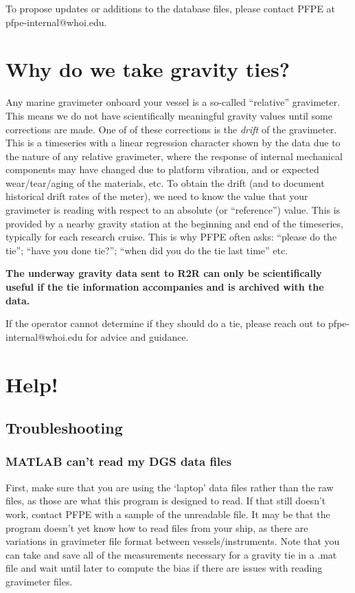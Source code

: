 \documentclass{pfpe-manual}
\begin{document}
To propose updates or additions to the database files, please contact PFPE at pfpe-internal@whoi.edu.

\section{Why do we take gravity ties?}
Any marine gravimeter onboard your vessel is a so-called “relative” gravimeter. This means we do not have scientifically meaningful gravity values until some corrections are made. One of of these corrections is the \emph{drift} of the gravimeter. This is a timeseries with a linear regression character shown by the data due to the nature of any relative gravimeter, where the response of internal mechanical components may have changed due to platform vibration, and or expected wear/tear/aging of the materials, etc. To obtain the drift (and to document historical drift rates of the meter), we need to know the value that your gravimeter is reading with respect to an absolute (or “reference”) value. This is provided by a nearby gravity station at the beginning and end of the timeseries, typically for each research cruise. This is why PFPE often asks: “please do the tie”; “have you done tie?”; “when did you do the tie last time” etc. 

\textbf{The underway gravity data sent to R2R can only be scientifically useful if the tie information accompanies and is archived with the data.}

If the operator cannot determine if they should do a tie, please reach out to pfpe-internal@whoi.edu for advice and guidance.

\section{Help!}
\label{helphelp}

\subsection{Troubleshooting}

\subsubsection{MATLAB can't read my DGS data files}
First, make sure that you are using the `laptop' data files rather than the raw files, as those are what this program is designed to read. If that still doesn't work, contact PFPE with a sample of the unreadable file. It may be that the program doesn't yet know how to read files from your ship, as there are variations in gravimeter file format between vessels/instruments. Note that you can take and save all of the measurements necessary for a gravity tie in a .mat file and wait until later to compute the bias if there are issues with reading gravimeter files.
\end{document}
